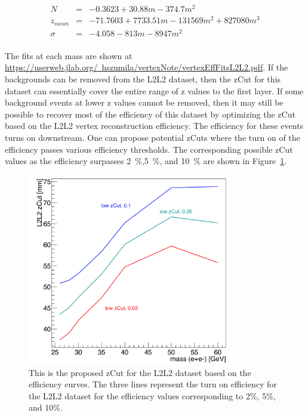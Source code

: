 \documentclass[twoside]{article}
\begin{document}
\begin{eqnarray*}
\label{eq:parsEpsVtxL2L2}
N & = & -0.3623+30.88m-374.7m^2\\
z_{mean} & = & -71.7603+7733.51m-131569m^2+827080m^3\\
\sigma & = & -4.058-813m-8947m^2\\
\end{eqnarray*}

The fits at each mass are shown at \href{url}{https://userweb.jlab.org/~hszumila/vertexNote/vertexEffFitsL2L2.pdf}. If the backgrounds can be removed from the L2L2 dataset, then the zCut for this dataset can essentially cover the entire range of z values to the first layer. If some background events at lower z values cannot be removed, then it may still be possible to recover most of the efficiency of this dataset by optimizing the zCut based on the L2L2 vertex reconstruction efficiency. The efficiency for these events turns on downstream. One can propose potential zCuts where the turn on of the efficiency passes various efficiency thresholds. The corresponding possible zCut values as the efficiency surpasses 2~$\%$,5~$\%$, and 10~$\%$ are shown in Figure~\ref{fig:proposedZ_L2L2}.

\begin{figure}[H]
  \centering
     \includegraphics[width=0.8\textwidth]{plots/L2L2_proposedZcut.png}
  \caption{This is the proposed zCut for the L2L2 dataset based on the efficiency curves. The three lines represent the turn on efficiency for the L2L2 dataset for the efficiency values corresponding to 2$\%$, 5$\%$, and 10$\%$.}
  \label{fig:proposedZ_L2L2}
\end{figure} 
\end{document}
